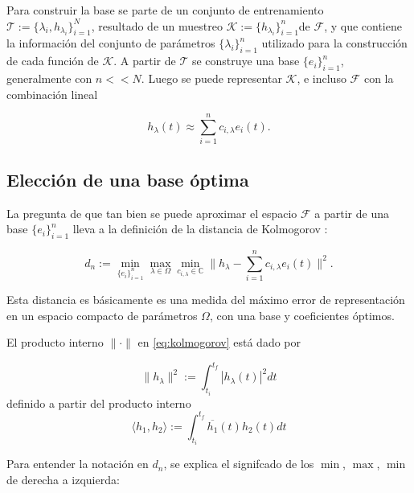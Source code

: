 Para construir la base se parte de un conjunto de entrenamiento $\mathcal{T} := \{\lambda_i, h_{\lambda_i}\}_{i=1}^N$, resultado de un muestreo $\mathcal{K} := \{h_{\lambda_i}\}_{i=1}^n$de $\mathcal{F}$, y que contiene la información del conjunto de parámetros $\{\lambda_i\}_{i=1}^n$ utilizado para la construcción de cada función de $\mathcal{K}$. A partir de $\mathcal{T}$ se construye una base $\{e_i\}_{i=1}^n$, generalmente con $n << N$. Luego se puede representar $\mathcal{K}$, e incluso $\mathcal{F}$ con la combinación lineal

\begin{equation}
\label{eq:rb0}
h_{\lambda} (t) \approx \sum_{i=1}^{n} c_{i,\lambda} e_i(t).
\end{equation}

\subsection{Elección de una base óptima}

La pregunta de que tan bien se puede aproximar el espacio $\mathcal{F}$ a partir de una base $\{e_i\}_{i=1}^n$ lleva a la definición de la distancia de Kolmogorov \cite{Pinkus1985nWidthsIA}:

\begin{equation} \label{eq:kolmogorov}
d_n := \min_{\{e_i\}_{i=1}^n} \max_{\lambda \in \Omega} \min_{ c_{i,\lambda} \in \mathbb{C}} \| h_{\lambda} - \sum_{i=1}^{n} c_{i,\lambda} e_i(t)\|^2.
\end{equation}



Esta distancia es básicamente es una medida del máximo error de representación en un espacio compacto de parámetros $\Omega$, con una base y coeficientes óptimos.

El producto interno $\|\cdot\|$ en \eqref{eq:kolmogorov} está dado por

\[
\|h_{\lambda}\|^2 :=\int_{t_i}^{t_f}|h_{\lambda}(t)|^2dt
\]
definido a partir del producto interno
\[
\langle h_1, h_2 \rangle  :=\int_{t_i}^{t_f} \overline{h_{1}}(t) h_2 (t)dt
\]

Para entender la notación en $d_n$, se explica el signifcado de los $\min$, $\max$, $\min$ de derecha a izquierda:

